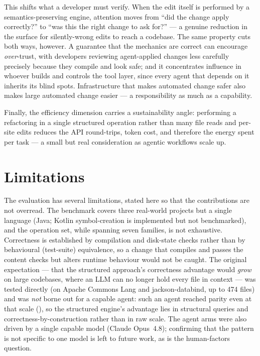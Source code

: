 This shifts what a developer must verify. When the edit itself is performed by a
semantics-preserving engine, attention moves from ``did the change apply correctly?'' to
``was this the right change to ask for?'' --- a genuine reduction in the surface for
silently-wrong edits to reach a codebase. The same property cuts both ways, however. A
guarantee that the mechanics are correct can encourage \emph{over}-trust, with
developers reviewing agent-applied changes less carefully precisely because they compile
and look safe; and it concentrates influence in whoever builds and controls the tool
layer, since every agent that depends on it inherits its blind spots. Infrastructure
that makes automated change safer also makes large automated change easier --- a
responsibility as much as a capability.

Finally, the efficiency dimension carries a sustainability angle: performing a
refactoring in a single structured operation rather than many file reads and per-site
edits reduces the API round-trips, token cost, and therefore the energy spent per task
--- a small but real consideration as agentic workflows scale up.

\section{Limitations}
\label{sec:concl-limitations}
The evaluation has several limitations, stated here so that the contributions are
not overread. The benchmark covers three real-world projects but a single language (Java; Kotlin
symbol-creation is implemented but not benchmarked), and the operation set, while
spanning seven families, is not exhaustive. Correctness is established by compilation
and disk-state checks rather than by behavioural (test-suite) equivalence, so a change
that compiles and passes the content checks but alters runtime behaviour would not be
caught. The original expectation --- that the structured approach's correctness
advantage would \emph{grow} on large codebases, where an LLM can no longer hold every
file in context --- was tested directly (on Apache Commons Lang and jackson-databind, up
to 474 files) and was \emph{not} borne out for a capable agent: such an agent reached
parity even at that scale (), so the structured engine's
advantage lies in structural queries and correctness-by-construction rather than in raw
scale. The agent arms were also driven by a single capable model (Claude Opus~4.8);
confirming that the pattern is not specific to one model is left to future work, as is
the human-factors question.

